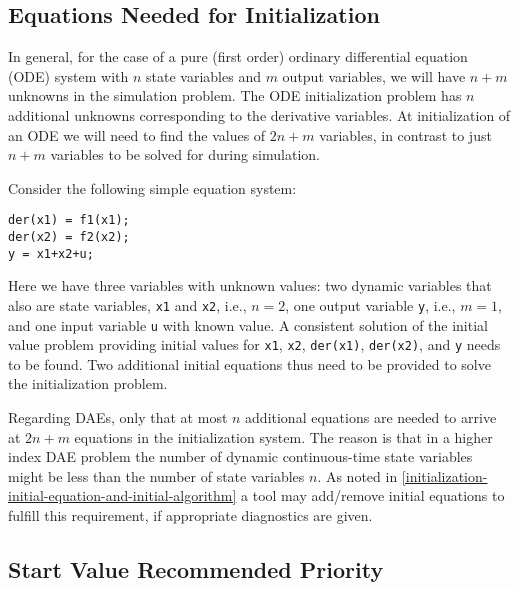 \subsection{Equations Needed for Initialization}\label{the-number-of-equations-needed-for-initialization}\label{equations-needed-for-initialization}

\begin{nonnormative}
In general, for the case of a pure (first order) ordinary differential equation (ODE) system with $n$ state variables and $m$ output variables, we will have $n+m$ unknowns in the simulation problem.
The ODE initialization problem has $n$ additional unknowns corresponding to the derivative variables.
At initialization of an ODE we will need to find the values of $2n+m$ variables, in contrast to just $n+m$ variables to be solved for during simulation.
\end{nonnormative}

\begin{example}
Consider the following simple equation system:
\begin{lstlisting}[language=modelica]
der(x1) = f1(x1);
der(x2) = f2(x2);
y = x1+x2+u;
\end{lstlisting}

Here we have three variables with unknown values: two dynamic variables that also are state variables, \lstinline!x1! and \lstinline!x2!, i.e., $n=2$, one output variable \lstinline!y!, i.e., $m=1$, and one input variable \lstinline!u! with known value.
A consistent solution of the initial value problem providing initial values for \lstinline!x1!, \lstinline!x2!, \lstinline!der(x1)!, \lstinline!der(x2)!, and \lstinline!y! needs to be found.
Two additional initial equations thus need to be provided to solve the initialization problem.

Regarding DAEs, only that at most $n$ additional equations are needed to arrive at $2n+m$ equations in the initialization system.
The reason is that in a higher index DAE problem the number of dynamic continuous-time state variables might be less than the number of state variables $n$.
As noted in \cref{initialization-initial-equation-and-initial-algorithm} a tool may add/remove initial equations to fulfill this requirement, if appropriate diagnostics are given.
\end{example}

\subsection{Start Value Recommended Priority}\label{recommended-selection-of-start-values}\label{start-value-recommended-priority}

